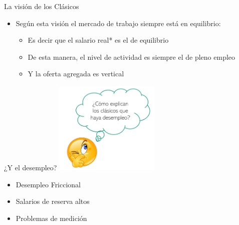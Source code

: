 \documentclass{beamer}
\begin{document}
\begin{frame}{La visión de los Clásicos}
\begin{itemize}
    \item Según esta visión el mercado de trabajo siempre está en equilibrio:
    \vspace{2mm}
    \begin{itemize}
    \scriptsize\item Es decir que el salario real* es el de equilibrio
    \scriptsize\item De esta manera, el nivel de actividad es siempre el de pleno empleo
    \scriptsize \item Y la oferta agregada es vertical
    \end{itemize}
\end{itemize}

\begin{figure}[H]
\renewcommand{\figurename}{Figure}
\begin{center}
\end{center}
\end{figure}

\end{frame}


\begin{frame}{¿Y el desempleo?}
    \centering\includegraphics[width=5cm]{Slides Principios de Economia/Figures/P29b.png}\
\begin{itemize}
\item Desempleo Friccional
\item Salarios de reserva altos
\item Problemas de medición
\end{itemize}
\end{frame}
\end{document}
